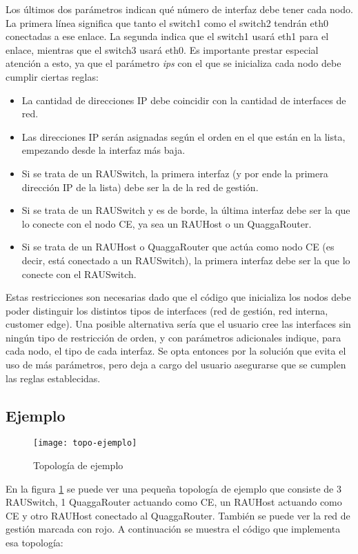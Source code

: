 Los últimos dos parámetros indican qué número de interfaz debe tener cada nodo. La primera línea significa que tanto el switch1 como el switch2 tendrán eth0 conectadas a ese enlace. La segunda indica que el switch1 usará eth1 para el enlace, mientras que el switch3 usará eth0. Es importante prestar especial atención a esto, ya que el parámetro \textit{ips} con el que se inicializa cada nodo debe cumplir ciertas reglas:
\begin{itemize}
	\item La cantidad de direcciones IP debe coincidir con la cantidad de interfaces de red.
	\item Las direcciones IP serán asignadas según el orden en el que están en la lista, empezando desde la interfaz más baja.
	\item Si se trata de un RAUSwitch, la primera interfaz (y por ende la primera dirección IP de la lista) debe ser la de la red de gestión.
	\item Si se trata de un RAUSwitch y es de borde, la última interfaz debe ser la que lo conecte con el nodo CE, ya sea un RAUHost o un QuaggaRouter.
	\item Si se trata de un RAUHost o QuaggaRouter que actúa como nodo CE (es decir, está conectado a un RAUSwitch), la primera interfaz debe ser la que lo conecte con el RAUSwitch.
\end{itemize}

Estas restricciones son necesarias dado que el código que inicializa los nodos debe poder distinguir los distintos tipos de interfaces (red de gestión, red interna, customer edge). Una posible alternativa sería que el usuario cree las interfaces sin ningún tipo de restricción de orden, y con parámetros adicionales indique, para cada nodo, el tipo de cada interfaz. Se opta entonces por la solución que evita el uso de más parámetros, pero deja a cargo del usuario asegurarse que se cumplen las reglas establecidas.

\subsection{Ejemplo}
\begin{figure}[t]
	\caption{Topología de ejemplo}
	\texttt{[image: topo-ejemplo]}
	\centering
	\label{fig:topo_ejemplo}
\end{figure}

En la figura \ref{fig:topo_ejemplo} se puede ver una pequeña topología de ejemplo que consiste de 3 RAUSwitch, 1 QuaggaRouter actuando como CE, un RAUHost actuando como CE y otro RAUHost conectado al QuaggaRouter. También se puede ver la red de gestión marcada con rojo. A continuación se muestra el código que implementa esa topología:

